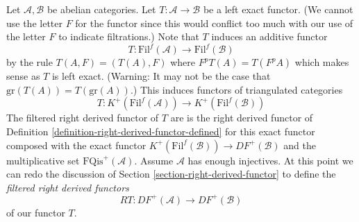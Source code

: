 \noindent
Let $\mathcal{A}, \mathcal{B}$ be abelian categories.
Let $T : \mathcal{A} \to \mathcal{B}$ be a left exact functor.
(We cannot use the letter $F$ for the functor since this would
conflict too much with our use of the letter $F$ to indicate
filtrations.) Note that $T$ induces an additive functor
$$
T : \text{Fil}^f(\mathcal{A}) \to \text{Fil}^f(\mathcal{B})
$$
by the rule $T(A, F) = (T(A), F)$ where $F^pT(A) = T(F^pA)$ which makes
sense as $T$ is left exact. (Warning: It may not be the case that
$\text{gr}(T(A)) = T(\text{gr}(A))$.)
This induces functors of triangulated categories
\begin{equation}
\label{equation-induced-T-filtered}
T :
K^{+}(\text{Fil}^f(\mathcal{A}))
\longrightarrow
K^{+}(\text{Fil}^f(\mathcal{B}))
\end{equation}
The filtered right derived functor of $T$ are is the right derived functor of
Definition \ref{definition-right-derived-functor-defined}
for this exact functor composed with the exact functor
$K^{+}(\text{Fil}^f(\mathcal{B})) \to DF^{+}(\mathcal{B})$ and the
multiplicative set $\text{FQis}^{+}(\mathcal{A})$.
Assume $\mathcal{A}$ has enough injectives. At this point we can redo the
discussion of 
Section \ref{section-right-derived-functor}
to define the
{\it filtered right derived functors}
\begin{equation}
\label{equation-filtered-derived-functor}
RT : DF^{+}(\mathcal{A}) \longrightarrow DF^{+}(\mathcal{B})
\end{equation}
of our functor $T$.

